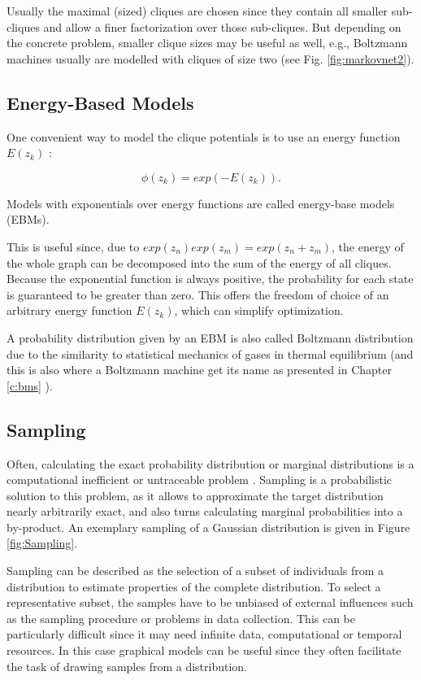 Usually the maximal (sized) cliques are chosen since they contain all smaller sub-cliques and allow a finer factorization over those sub-cliques.
But depending on the concrete problem, smaller clique sizes may be useful as well, e.g., Boltzmann machines usually are modelled with cliques of size two (see Fig. \ref{fig:markovnet2}).




\subsection{Energy-Based Models} \label{c:ebms}

One convenient way to model the clique potentials is to use an energy function $E(z_k)$ \cite{Goodfellow-et-al-2016-Book}: 

\[
\phi(z_k) = exp(- E(z_k)).
\]

Models with exponentials over energy functions are called energy-base models (EBMs).

This is useful since, due to $exp(z_n)exp(z_m) = exp(z_n+z_m)$, the energy of the whole graph can be decomposed into the sum of the energy of all cliques.
Because the exponential function is always positive, the probability for each state is guaranteed to be greater than zero. 
This offers the freedom of choice of an arbitrary energy function $E(z_k)$, which can simplify optimization. 

A probability distribution given by an EBM is also called Boltzmann distribution due to the similarity to statistical mechanics of gases in thermal equilibrium (and this is also where a Boltzmann machine get its name as presented in Chapter \ref{c:bms} ).

\subsection{Sampling} \label{c:sampling}

Often, calculating the exact probability distribution or marginal distributions is a computational inefficient or untraceable problem \cite{Goodfellow-et-al-2016-Book, Petrovici2016}.
Sampling is a probabilistic solution to this problem, as it allows to approximate the target distribution nearly arbitrarily exact, and also turns calculating marginal probabilities into a by-product.  
An exemplary sampling of a Gaussian distribution is given in Figure \ref{fig:Sampling}.

Sampling can be described as the selection of a subset of individuals from a distribution to estimate properties of the complete distribution.
To select a representative subset, the samples have to be unbiased of external influences such as the sampling procedure or problems in data collection.
This can be particularly difficult since it may need infinite data, computational or temporal resources.
In this case graphical models can be useful since they often facilitate the task of drawing samples from a distribution.

